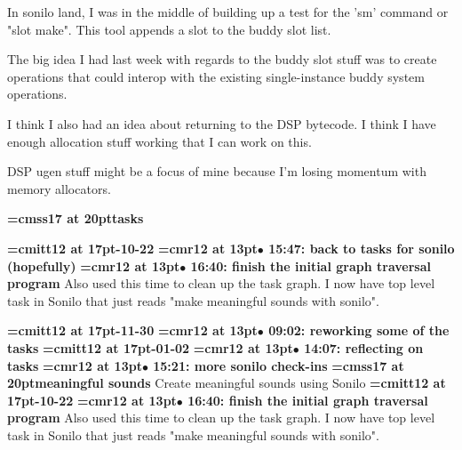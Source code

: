 In sonilo land, I was in the middle of building up a test for the 'sm' command or "slot make". This tool appends a slot to the buddy slot list.
\par

The big idea I had last week with regards to the buddy slot stuff was to create operations that could interop with the existing single-instance buddy system operations.
\par

I think I also had an idea about returning to the DSP bytecode. I think I have enough allocation stuff working that I can work on this.
\par

DSP ugen stuff might be a focus of mine because I'm losing momentum with memory allocators.
\par

{\medskip\noindent\bf\font\titlefont=cmss17 at 20pt\titlefont tasks}\medskip

{\medskip\noindent\bf\font\titlefont=cmitt12 at 17pt-10-22}\medskip
{\smallskip\noindent\bf\font\titlefont=cmr12 at 13pt\titlefont $\bullet$ 15:47: back to tasks for sonilo (hopefully)}\smallskip
{\smallskip\noindent\bf\font\titlefont=cmr12 at 13pt\titlefont $\bullet$ 16:40: finish the initial graph traversal program}\smallskip
Also used this time to clean up the task graph. I now have top level task in Sonilo that just reads "make meaningful sounds with sonilo".
\par

{\medskip\noindent\bf\font\titlefont=cmitt12 at 17pt-11-30}\medskip
{\smallskip\noindent\bf\font\titlefont=cmr12 at 13pt\titlefont $\bullet$ 09:02: reworking some of the tasks}\smallskip
{\medskip\noindent\bf\font\titlefont=cmitt12 at 17pt-01-02}\medskip
{\smallskip\noindent\bf\font\titlefont=cmr12 at 13pt\titlefont $\bullet$ 14:07: reflecting on tasks}\smallskip
{\smallskip\noindent\bf\font\titlefont=cmr12 at 13pt\titlefont $\bullet$ 15:21: more sonilo check-ins}\smallskip
{}
{\medskip\noindent\bf\font\titlefont=cmss17 at 20pt\titlefont meaningful sounds}\medskip
Create meaningful sounds using Sonilo
{\medskip\noindent\bf\font\titlefont=cmitt12 at 17pt-10-22}\medskip
{\smallskip\noindent\bf\font\titlefont=cmr12 at 13pt\titlefont $\bullet$ 16:40: finish the initial graph traversal program}\smallskip
Also used this time to clean up the task graph. I now have top level task in Sonilo that just reads "make meaningful sounds with sonilo".
\par

